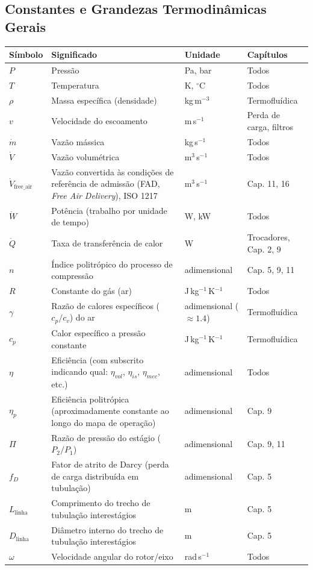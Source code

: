 \documentclass[12pt,a4paper]{article}
\numberwithin{equation}{section}
\numberwithin{table}{section}
\numberwithin{figure}{section}
\begin{document}
{{\small
\setlength{\tabcolsep}{3pt}
\renewcommand{\arraystretch}{1.15}

\subsection*{Constantes e Grandezas Termodinâmicas Gerais}
\begin{longtable}{>{\raggedright\arraybackslash}p{2.8cm} >{\raggedright\arraybackslash}p{5.3cm} >{\raggedright\arraybackslash}p{2.1cm} >{\raggedright\arraybackslash}p{4.2cm}}
	\toprule
	\textbf{Símbolo} & \textbf{Significado} & \textbf{Unidade} & \textbf{Capítulos} \\ \midrule
	\endhead
	$P$ & Pressão & Pa, bar & Todos \\
	$T$ & Temperatura & K, $^{\circ}$C & Todos \\
	$\rho$ & Massa específica (densidade) & kg\,m$^{-3}$ & Termofluídica \\
	$v$ & Velocidade do escoamento & m\,s$^{-1}$ & Perda de carga, filtros \\
	$\dot{m}$ & Vazão mássica & kg\,s$^{-1}$ & Todos \\
	$\dot{V}$ & Vazão volumétrica & m$^3$\,s$^{-1}$ & Todos \\
	$\dot{V}_{\text{free\_air}}$ & Vazão convertida às condições de referência de admissão (FAD, \textit{Free Air Delivery}), ISO 1217 & m$^3$\,s$^{-1}$ & Cap. 11, 16 \\
	$\dot{W}$ & Potência (trabalho por unidade de tempo) & W, kW & Todos \\
	$\dot{Q}$ & Taxa de transferência de calor & W & Trocadores, Cap. 2, 9 \\
	$n$ & Índice politrópico do processo de compressão & adimensional & Cap. 5, 9, 11 \\
	$R$ & Constante do gás (ar) & J\,kg$^{-1}$\,K$^{-1}$ & Todos \\
	$\gamma$ & Razão de calores específicos ($c_p/c_v$) do ar & adimensional ($\approx 1.4$) & Termofluídica \\
	$c_p$ & Calor específico a pressão constante & J\,kg$^{-1}$\,K$^{-1}$ & Termofluídica \\
	$\eta$ & Eficiência (com subscrito indicando qual: $\eta_{vol}$, $\eta_{is}$, $\eta_{mec}$, etc.) & adimensional & Todos \\
	$\eta_p$ & Eficiência politrópica (aproximadamente constante ao longo do mapa de operação) & adimensional & Cap. 9 \\
	$\Pi$ & Razão de pressão do estágio ($P_2/P_1$) & adimensional & Cap. 9, 11 \\
	$f_D$\dag & Fator de atrito de Darcy (perda de carga distribuída em tubulação) & adimensional & Cap. 5 \\
	$L_{\text{linha}}$ & Comprimento do trecho de tubulação interestágios & m & Cap. 5 \\
	$D_{\text{linha}}$ & Diâmetro interno do trecho de tubulação interestágios & m & Cap. 5 \\
	$\omega$ & Velocidade angular do rotor/eixo & rad\,s$^{-1}$ & Todos \\ \bottomrule
\end{longtable}

}}
\end{document}
